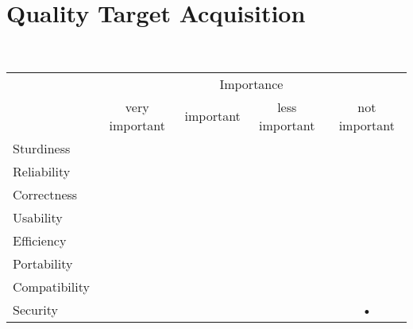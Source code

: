 \section{Quality Target Acquisition}

~\\

\begin{center}
	
	\begin{tabular}{lcccc}
		
		\cline{2-5}
		& \multicolumn{4}{c}{Importance} \\
		\cline{2-5}
			 & very important & important & less important & not important \\
		\hline \hline
		
		\multicolumn{1}{l||}{Sturdiness} & & & & \\ \hline
		\multicolumn{1}{l||}{Reliability} & & & &  \\ \hline
		\multicolumn{1}{l||}{Correctness} & & & &  \\ \hline
		\multicolumn{1}{l||}{Usability} & & & &  \\ \hline
		\multicolumn{1}{l||}{Efficiency} & & & &  \\ \hline
		\multicolumn{1}{l||}{Portability} & & & &  \\ \hline
		\multicolumn{1}{l||}{Compatibility} & & & &  \\ \hline
		\multicolumn{1}{l||}{Security} & & & & \textbf{•} \\ 
		
		\hline \hline
	
	\end{tabular}
	
\end{center}